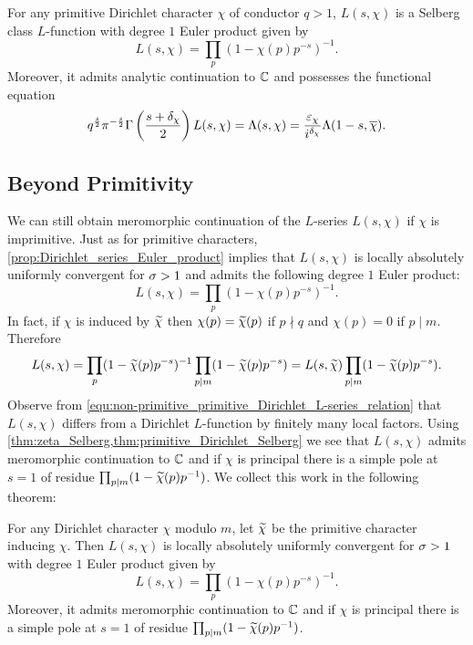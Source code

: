       \begin{theorem}\label{thm:primitive_Dirichlet_Selberg}
        For any primitive Dirichlet character $\chi$ of conductor $q > 1$, $L(s,\chi)$ is a Selberg class $L$-function with degree $1$ Euler product given by
        \[
          L(s,\chi) = \prod_{p}(1-\chi(p)p^{-s})^{-1}.
        \]
        Moreover, it admits analytic continuation to $\mathbb{C}$ and possesses the functional equation
        \[
          q^{\frac{s}{2}}\pi^{-\frac{s}{2}}\Gamma\left(\frac{s+\delta_{\chi}}{2}\right)L(s,\chi) = \Lambda(s,\chi) = \frac{\varepsilon_{\chi}}{i^{\delta_{\chi}}}\Lambda(1-s,\overline{\chi}).
        \]
      \end{theorem}
    \subsection*{Beyond Primitivity}
      We can still obtain meromorphic continuation of the $L$-series $L(s,\chi)$ if $\chi$ is imprimitive. Just as for primitive characters, \cref{prop:Dirichlet_series_Euler_product} implies that $L(s,\chi)$ is locally absolutely uniformly convergent for $\sigma > 1$ and admits the following degree $1$ Euler product:
      \[
        L(s,\chi) = \prod_{p}(1-\chi(p)p^{-s})^{-1}.
      \]
      In fact, if $\chi$ is induced by $\widetilde{\chi}$ then $\chi(p) = \widetilde{\chi}(p)$ if $p \nmid q$ and $\chi(p) = 0$ if $p \mid m$. Therefore
      \begin{equation}\label{equ:non-primitive_primitive_Dirichlet_L-series_relation}
        L(s,\chi) = \prod_{p}(1-\widetilde{\chi}(p)p^{-s})^{-1}\prod_{p \mid m}(1-\widetilde{\chi}(p)p^{-s}) = L(s,\widetilde{\chi})\prod_{p \mid m}(1-\widetilde{\chi}(p)p^{-s}).
      \end{equation}
      Observe from \cref{equ:non-primitive_primitive_Dirichlet_L-series_relation} that $L(s,\chi)$ differs from a Dirichlet $L$-function by finitely many local factors. Using \cref{thm:zeta_Selberg,thm:primitive_Dirichlet_Selberg} we see that $L(s,\chi)$ admits meromorphic continuation to $\mathbb{C}$ and if $\chi$ is principal there is a simple pole at $s = 1$ of residue $\prod_{p \mid m}(1-\widetilde{\chi}(p)p^{-1})$. We collect this work in the following theorem:

      \begin{theorem}\label{thm:analytic_continuation_Dirichlet}
        For any Dirichlet character $\chi$ modulo $m$, let $\widetilde{\chi}$ be the primitive character inducing $\chi$. Then $L(s,\chi)$ is locally absolutely uniformly convergent for $\sigma > 1$ with degree $1$ Euler product given by
        \[
          L(s,\chi) = \prod_{p}(1-\chi(p)p^{-s})^{-1}.
        \]
        Moreover, it admits meromorphic continuation to $\mathbb{C}$ and if $\chi$ is principal there is a simple pole at $s = 1$ of residue $\prod_{p \mid m}(1-\widetilde{\chi}(p)p^{-1})$.
      \end{theorem}
      
